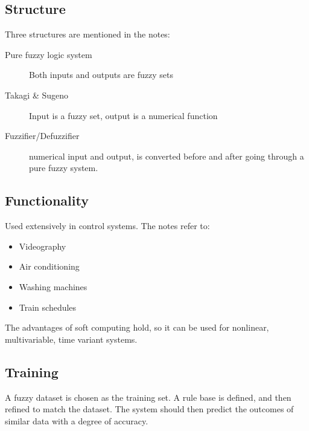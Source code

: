 \documentclass{report}
\begin{document}
\subsection{Structure}
Three structures are mentioned in the notes:
\begin{description}
	\item[Pure fuzzy logic system] Both inputs and outputs are fuzzy sets
	\item[Takagi \& Sugeno] Input is a fuzzy set, output is a numerical function
	\item[Fuzzifier/Defuzzifier] numerical input and output, is converted before and after going through a pure fuzzy system.
\end{description}
\subsection{Functionality}
Used extensively in control systems. The notes refer to:
\begin{itemize}
	\item Videography
	\item Air conditioning
	\item Washing machines
	\item Train schedules
\end{itemize}
The advantages of soft computing hold, so it can be used for nonlinear, multivariable, time variant systems. 
\subsection{Training}
A fuzzy dataset is chosen as the training set. A rule base is defined, and then refined to match the dataset. The system should then predict the outcomes of similar data with a degree of accuracy.
\end{document}
